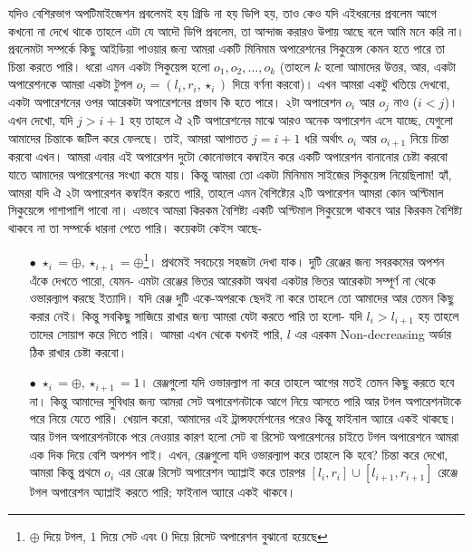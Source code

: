 \begin{solution}
যদিও বেশিরভাগ অপটিমাইজেশন প্রবলেমই হয় গ্রিডি না হয় ডিপি হয়, তাও কেও যদি এইধরনের প্রবলেম আগে কখনো না দেখে থাকে তাহলে এটা যে আদৌ ডিপি প্রবলেম, তা আন্দাজ করারও উপায় আছে বলে আমি মনে করি না। প্রবলেমটা সম্পর্কে কিছু আইডিয়া পাওয়ার জন্য আমরা একটি মিনিমাম অপারেশনের সিকুয়েন্স কেমন হতে পারে তা চিন্তা করতে পারি। ধরো এমন একটা সিকুয়েন্স হলো $o_1, o_2, \ldots, o_k$ (তাহলে $k$ হলো আমাদের উত্তর, আর, একটা অপারেশনকে আমরা একটা টুপল $o_i = (l_i, r_i, \star_i)$ দিয়ে বর্ণনা করবো)।  এখন আমরা একটু খতিয়ে দেখবো, একটা অপারেশনের ওপর আরেকটা অপারেশনের প্রভাব কি হতে পারে। ২টা অপারেশন $o_i$ আর $o_j$ নাও ($i < j$)। এখন দেখো, যদি $j > i+1$ হয় তাহলে ঐ ২টি অপারেশনের মাঝে আরও অনেক অপারেশন এসে যাচ্ছে, যেগুলো আমাদের চিন্তাকে জটিল করে ফেলছে। তাই, আমরা আপাতত $j=i+1$ ধরি অর্থাৎ $o_i$ আর $o_{i+1}$ নিয়ে চিন্তা করবো এখন। আমরা এবার এই অপারেশন দুটো কোনোভাবে কম্বাইন করে একটি অপারেশন বানানোর চেষ্টা করবো যাতে আমাদের অপারেশনের সংখ্যা কমে যায়। কিন্তু আমরা তো একটা মিনিমাম সাইজের সিকুয়েন্স নিয়েছিলাম! হ্যাঁ, আমরা যদি ঐ ২টা অপারেশন কম্বাইন করতে পারি, তাহলে এমন বৈশিষ্ট্যের ২টি অপারেশন আমরা কোন অপ্টিমাল সিকুয়েন্সে  পাশাপাশি পাবো না। এভাবে আমরা কিরকম বৈশিষ্ট্য একটি অপ্টিমাল সিকুয়েন্সে থাকবে আর কিরকম বৈশিষ্ট্য থাকবে না তা সম্পর্কে ধারনা পেতে পারি। কয়েকটা কেইস আছে-
\begin{itemize}
  \item[$\bullet$] $\star_i = \oplus, \star_{i+1} = \oplus$\footnote{$\oplus$ দিয়ে টগল, $1$ দিয়ে সেট এবং $0$ দিয়ে রিসেট অপারেশন বুঝানো হয়েছে}। প্রথমেই সবচেয়ে সহজটা দেখা যাক। দুটি রেঞ্জের জন্য সবরকমের অপশন এঁকে দেখতে পারো, যেমন- এমটা রেঞ্জের ভিতর আরেকটা অথবা একটার ভিতর আরেকটা সম্পূর্ণ না থেকে ওভারল্যাপ করছে ইত্যাদি। যদি রেঞ্জ দুটি একে-অপরকে  ছেদই না করে তাহলে তো আমাদের আর তেমন কিছু করার নেই। কিন্তু সবকিছু সাজিয়ে রাখার জন্য আমরা যেটা করতে পারি তা হলো- যদি $l_i > l_{i+1}$ হয় তাহলে তাদের সোয়াপ করে দিতে পারি। আমরা এখন থেকে যখনই পারি, $l$ এর এরকম Non-decreasing অর্ডার ঠিক রাখার চেষ্টা করবো।
  \item[$\bullet$] $\star_i = \oplus, \star_{i+1} = 1$।  রেঞ্জগুলো যদি ওভারল্যাপ না করে তাহলে আগের মতই তেমন কিছু করতে হবে না। কিন্তু আমাদের সুবিধার জন্য আমরা সেট অপারেশনটাকে আগে নিয়ে আসতে পারি আর টগল অপারেশনটাকে পরে নিয়ে যেতে পারি। খেয়াল করো, আমাদের এই ট্রান্সফর্মেশনের পরেও কিন্তু ফাইনাল অ্যারে একই থাকছে। আর টগল অপারেশনটাকে পরে নেওয়ার কারণ হলো সেট বা রিসেট অপারেশনের চাইতে টগল অপারেশনে আমরা এক দিক দিয়ে বেশি অপশন পাই। এখন, রেঞ্জগুলো যদি ওভারল্যাপ করে তাহলে কি হবে? চিন্তা করে দেখো, আমরা কিন্তু প্রথমে $o_i$ এর রেঞ্জে রিসেট অপারেশন অ্যাপ্লাই করে তারপর $[l_i, r_i] \cup [l_{i+1}, r_{i+1}]$ রেঞ্জে টগল অপারেশন অ্যাপ্লাই করতে পারি; ফাইনাল অ্যারে একই থাকবে।

\end{itemize}
\end{solution}
